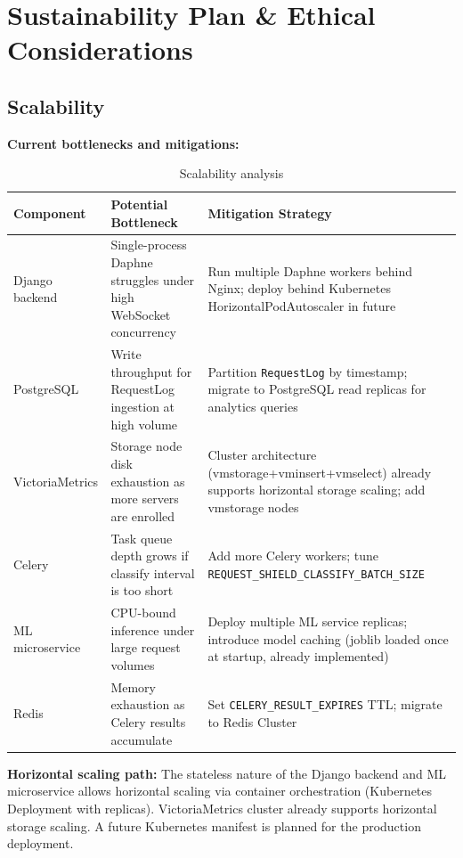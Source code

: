 \chapter{Sustainability Plan \& Ethical Considerations}\label{ch:sustain}

\section{Scalability}

\textbf{Current bottlenecks and mitigations:}

\begin{table}[H]
\centering
\caption{Scalability analysis}\label{tab:scalability}
\begin{tabularx}{\textwidth}{@{}l X X@{}}
\toprule
\textbf{Component} & \textbf{Potential Bottleneck} & \textbf{Mitigation Strategy}\\
\midrule
Django backend &
  Single-process Daphne struggles under high WebSocket concurrency &
  Run multiple Daphne workers behind Nginx; deploy behind Kubernetes
  HorizontalPodAutoscaler in future\\
PostgreSQL &
  Write throughput for RequestLog ingestion at high volume &
  Partition \texttt{RequestLog} by timestamp; migrate to PostgreSQL
  read replicas for analytics queries\\
VictoriaMetrics &
  Storage node disk exhaustion as more servers are enrolled &
  Cluster architecture (vmstorage+vminsert+vmselect) already supports
  horizontal storage scaling; add vmstorage nodes\\
Celery &
  Task queue depth grows if classify interval is too short &
  Add more Celery workers; tune
  \texttt{REQUEST\_SHIELD\_\allowbreak CLASSIFY\_\allowbreak BATCH\_SIZE}\\
ML microservice &
  CPU-bound inference under large request volumes &
  Deploy multiple ML service replicas; introduce model caching (joblib
  loaded once at startup, already implemented)\\
Redis &
  Memory exhaustion as Celery results accumulate &
  Set \texttt{CELERY\_RESULT\_EXPIRES} TTL; migrate to Redis Cluster\\
\bottomrule
\end{tabularx}
\end{table}

\textbf{Horizontal scaling path:} The stateless nature of the Django backend
and ML microservice allows horizontal scaling via container orchestration
(Kubernetes Deployment with replicas).  VictoriaMetrics cluster already
supports horizontal storage scaling.  A future Kubernetes manifest is
planned for the production deployment.

